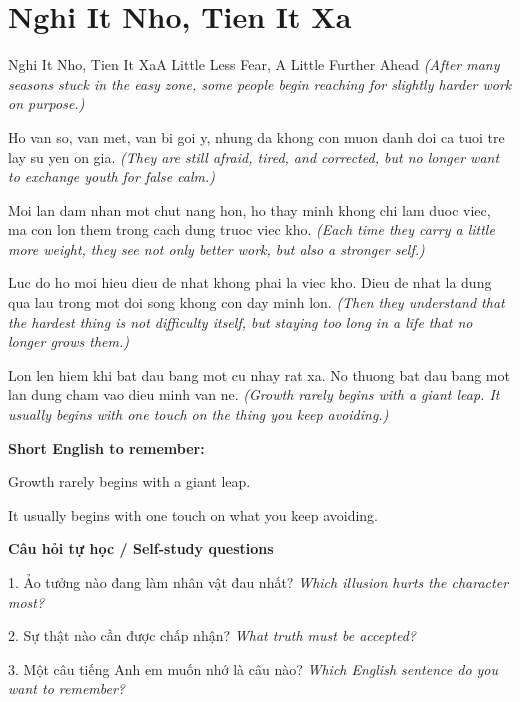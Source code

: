 \section{Nghi It Nho, Tien It Xa}
\begin{truyen}{Nghi It Nho, Tien It Xa}{A Little Less Fear, A Little Further Ahead}
\textit{(After many seasons stuck in the easy zone, some people begin reaching for slightly harder work on purpose.)}

Ho van so, van met, van bi goi y, nhung da khong con muon danh doi ca tuoi tre lay su yen on gia.
\textit{(They are still afraid, tired, and corrected, but no longer want to exchange youth for false calm.)}

Moi lan dam nhan mot chut nang hon, ho thay minh khong chi lam duoc viec, ma con lon them trong cach dung truoc viec kho.
\textit{(Each time they carry a little more weight, they see not only better work, but also a stronger self.)}

Luc do ho moi hieu dieu de nhat khong phai la viec kho. Dieu de nhat la dung qua lau trong mot doi song khong con day minh lon.
\textit{(Then they understand that the hardest thing is not difficulty itself, but staying too long in a life that no longer grows them.)}

\end{truyen}

\begin{baihoc}
Lon len hiem khi bat dau bang mot cu nhay rat xa. No thuong bat dau bang mot lan dung cham vao dieu minh van ne.
\textit{(Growth rarely begins with a giant leap. It usually begins with one touch on the thing you keep avoiding.)}
\end{baihoc}

\begin{ghinhoanh}
\textbf{Short English to remember:}

Growth rarely begins with a giant leap.

It usually begins with one touch on what you keep avoiding.

\end{ghinhoanh}

\begin{tuhocnhanh}
\textbf{Câu hỏi tự học / Self-study questions}

1. Ảo tưởng nào đang làm nhân vật đau nhất? \textit{Which illusion hurts the character most?}

2. Sự thật nào cần được chấp nhận? \textit{What truth must be accepted?}

3. Một câu tiếng Anh em muốn nhớ là câu nào? \textit{Which English sentence do you want to remember?}
\end{tuhocnhanh}
